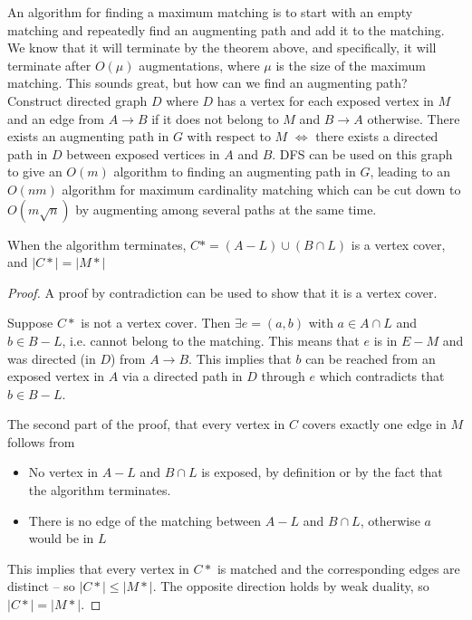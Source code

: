 \documentclass[../notes.tex]{subfiles}
\begin{document}
An algorithm for finding a maximum matching is to start with an empty matching and repeatedly find an augmenting path and add it to the matching. 
We know that it will terminate by the theorem above, and specifically, it will terminate after $ O(\mu) $ augmentations, where $ \mu $ is the size of the maximum matching. 
This sounds great, but how can we find an augmenting path? Construct directed graph $ D $ where $ D $ has a vertex for each exposed vertex in $ M $ and an edge from $ A \to B $ if it does not belong to $ M $ and $ B \to A $ otherwise.
There exists an augmenting path in $ G $ with respect to $ M $ $ \iff $ there exists a directed path in $ D $ between exposed vertices in $ A $ and $ B $. DFS can be used on this graph to give an $ O(m) $ algorithm to finding an augmenting path in $ G $, leading to an $ O(nm) $ algorithm for maximum cardinality matching which can be cut down to $ O(m \sqrt{n})$ by augmenting among several paths at the same time.

When the algorithm terminates, $ C* = (A-L) \cup (B \cap L) $ is a vertex cover, and $ |C*| = |M*|$

\begin{proof}
    A proof by contradiction can be used to show that it is a vertex cover.

    Suppose $ C* $ is not a vertex cover. Then $ \exists e = (a,b)  $ with $ a \in A\cap L $ and $ b \in B - L $, i.e. cannot belong to the matching. This means that $ e $ is in $ E - M $ and was directed (in $ D $) from $  A \to B $.
    This implies that $ b $ can be reached from an exposed vertex in $ A $  via a directed path in $ D $ through $ e $ which contradicts that $ b \in B-L $.


    The second part of the proof, that every vertex in $ C $ covers exactly one edge in $ M $ follows from

    \begin{itemize}
        \item No vertex in $ A-L $ and $ B \cap L $ is exposed, by definition or by the fact that the algorithm terminates.
        \item There is no edge of the matching between $ A-L $ and $ B \cap L $, otherwise $ a $ would be in $ L $
    \end{itemize}

    This implies that every vertex in $ C* $ is matched and the corresponding edges are distinct -- so $ |C*| \le  |M*| $. The opposite direction holds by weak duality, so $ |C*| = |M*| $.

\end{proof}
\end{document}
